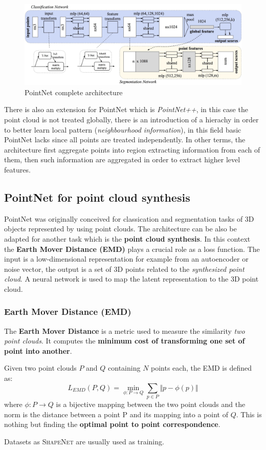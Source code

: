 \begin{figure}[h]
    \centering
    \includegraphics[scale=0.6]{img/PointNetFull.png}
    \caption{PointNet complete architecture}
\end{figure}

There is also an extension for PointNet which is \textit{PointNet++}, in this case the point cloud is not treated globally, there is an introduction of a hierachy in order to better learn local pattern (\textit{neighbourhood information}), in this field basic PointNet lacks since all points are treated independently. In other terms, the architecture first aggregate points into region extracting information from each of them, then such information are aggregated in order to extract higher level features.

\subsection{PointNet for point cloud synthesis}
PointNet was originally conceived for classication and segmentation tasks of 3D objects represented by using point clouds. The architecture can be also be adapted for another task which is the \textbf{point cloud synthesis}. In this context the \textbf{Earth Mover Distance (EMD)} plays a crucial role as a loss function. The input is a low-dimensional representation for example from an autoencoder or noise vector, the output is a set of 3D points related to the \textit{synthesized point cloud}. A neural network is used to map the latent representation to the 3D point cloud. 

\subsubsection{Earth Mover Distance (EMD)}
The \textbf{Earth Mover Distance} is a metric used to measure the similarity \textit{two point clouds}. It computes the \textbf{minimum cost of transforming one set of point into another}. 
\begin{definition}
    Given two point clouds $P$ and $Q$ containing $N$ points each, the EMD is defined as: 
    \begin{equation}
        L_{EMD}(P,Q)=\min_{\phi :P\to{Q}}{\sum_{p\in{P}} \Vert p-\phi(p)} \Vert
    \end{equation}
    where $\phi:{P}\to{Q}$ is a bijective mapping between the two point clouds and the norm is the distance between a point P and its mapping into a point of $Q$. This is nothing but finding the \textbf{optimal point to point correspondence}.
\end{definition}
\noindent
Datasets as \textsc{ShapeNet} are usually used as training.

